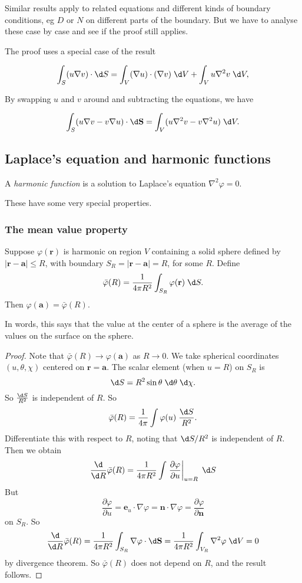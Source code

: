 \documentclass[a4paper]{article}
\begin{document}
\note Similar results apply to related equations and different kinds of boundary conditions, eg $D$ or $N$ on different parts of the boundary. But we have to analyse these case by case and see if the proof still applies.


The proof uses a special case of the result
\begin{prop}
  \[
    \int_S (u\nabla v)\cdot \d S = \int_V (\nabla u)\cdot (\nabla v)\;\d V + \int_V u\nabla^2 v\;\d V,
  \]
\end{prop}
By swapping $u$ and $v$ around and subtracting the equations, we have
\begin{prop}
  \[
    \int_S (u\nabla v - v\nabla u)\cdot\d \mathbf{S} = \int_V (u\nabla^2 v - v\nabla^2 u)\;\d V.
  \]
\end{prop}
\subsection{Laplace's equation and harmonic functions}
\begin{defi}
  A \emph{harmonic function} is a solution to Laplace's equation $\nabla^2\varphi = 0$.
\end{defi}
These have some very special properties.
\subsubsection{The mean value property}
\begin{prop}
  Suppose $\varphi(\mathbf{r})$ is harmonic on region $V$ containing a solid sphere defined by $|\mathbf{r} - \mathbf{a}| \leq R$, with boundary $S_R = |\mathbf{r} - \mathbf{a}| = R$, for some $R$. Define
  \[
    \bar\varphi (R) = \frac{1}{4\pi R^2}\int_{S_R}\varphi(\mathbf{r})\;\d S.
  \]
  Then $\varphi(\mathbf{a}) = \bar\varphi (R)$.
\end{prop}
In words, this says that the value at the center of a sphere is the average of the values on the surface on the sphere.

\begin{proof}
  Note that $\bar\varphi (R) \to \varphi(\mathbf{a})$ as $R \to 0$. We take spherical coordinates $(u, \theta, \chi)$ centered on $\mathbf{r} = \mathbf{a}$. The scalar element (when $u = R$) on $S_R$ is
  \[
    \d S = R^2 \sin \theta\;\d \theta\;\d \chi.
  \]
  So $\frac{\d S}{R^2}$ is independent of $R$. So
  \[
    \bar\varphi(R) = \frac{1}{4\pi}\int \varphi(u)\;\frac{\d S}{R^2}.
  \]
  Differentiate this with respect to $R$, noting that $\d S/R^2$ is independent of $R$. Then we obtain
  \[
    \frac{\d}{\d R}\bar\varphi(R) = \frac{1}{4\pi R^2}\int \left.\frac{\partial \varphi}{\partial u}\right|_{u = R}\;\d S
  \]
  But
  \[
    \frac{\partial\varphi}{\partial u} = \mathbf{e}_u \cdot \nabla \varphi = \mathbf{n}\cdot \nabla \varphi = \frac{\partial\varphi}{\partial \mathbf{n}}
  \]
  on $S_R$. So
  \[
    \frac{\d}{\d R}\bar\varphi(R) = \frac{1}{4\pi R^2}\int_{S_R} \nabla \varphi \cdot \d \mathbf{S} = \frac{1}{4\pi R^2}\int_{V_R}\nabla^2 \varphi \;\d V = 0
  \]
  by divergence theorem. So $\bar \varphi(R)$ does not depend on $R$, and the result follows.
\end{proof}
\end{document}
